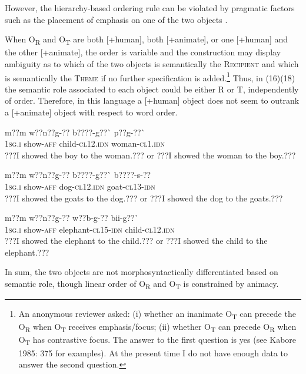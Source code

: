 \documentclass[output=paper]{langsci/langscibook}
\begin{document}
However, the hierarchy-based ordering rule can be violated by pragmatic factors such as the placement of emphasis on one of the two objects \citep[375]{Kabore1985}.

When O\textsubscript{R} and O\textsubscript{T} are both [+human], both [+animate], or one [+human] and the other [+animate],  the order is variable and the construction may display ambiguity as to which of the two objects is semantically the \textsc{Recipient} and which is semantically the \textsc{Theme} if no further specification is added.\footnote{ An anonymous reviewer asked: (i) whether an inanimate O\textsubscript{T} can precede the O\textsubscript{R} when O\textsubscript{T} receives emphasis/focus; (ii) whether O\textsubscript{T }can precede O\textsubscript{R} when O\textsubscript{T} has contrastive focus. The answer to the first question is yes (see Kabore 1985: 375 for examples). At the present time I do not have enough data to answer the second question.} Thus, in (16)(18) the semantic role associated to each object could be either R or T, independently of order. Therefore, in this language a [+human] object does not seem to outrank a [+animate] object with respect to word order.


\ea \gll 
\label{bkm:Ref424143119}m??m    w??n??g-??    b????-g??\`{ }      p??g-??\`{ }
\\
%
\textsc{1sg.i  }  show-\textsc{aff}    child-\textsc{cl12.idn}  woman-\textsc{cl1.idn}
\\\glt
???I showed the boy to the woman.??? or ???I showed the woman to the boy.???
\z


\ea \gll 
m??m    w??n??g-??    b????-g??\`{ }    b????-s-??
\\
%
\textsc{1sg.i  }  show-\textsc{aff}    dog-\textsc{cl12.idn}  goat-\textsc{cl13-idn}
\\\glt
???I showed the goats to the dog.??? or ???I showed the dog to the goats.???  
\z


\ea \gll 
\label{bkm:Ref424143137}m??m    w??n??g-??    w??b-g-??    bii-g??\`{ }
\\
%
\textsc{1sg.i  }  show-\textsc{aff}    elephant-\textsc{cl15-idn}  child-\textsc{cl12.idn}
\\\glt
???I showed the elephant to the child.??? or ???I showed the child to the elephant.???
\z

In sum, the two objects are not morphosyntactically differentiated based on semantic role, though linear order of O\textsubscript{R} and O\textsubscript{T }is constrained by animacy.
\end{document}
